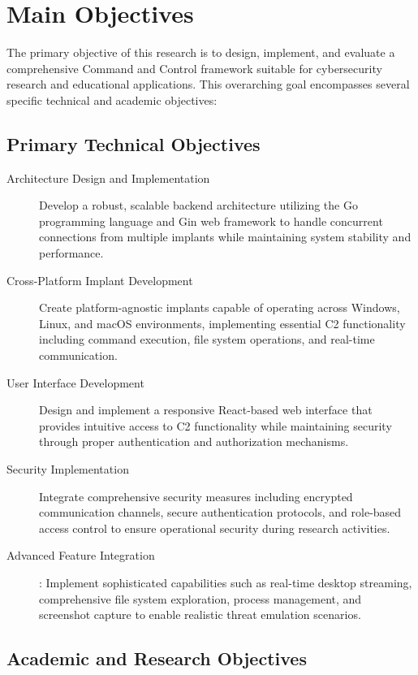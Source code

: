 \section{Main Objectives}
\label{sec:objectives}

The primary objective of this research is to design, implement, and evaluate a comprehensive Command and Control framework suitable for cybersecurity research and educational applications. This overarching goal encompasses several specific technical and academic objectives:

\subsection{Primary Technical Objectives}

\begin{description}
\item[Architecture Design and Implementation] Develop a robust, scalable backend architecture utilizing the Go programming language and Gin web framework to handle concurrent connections from multiple implants while maintaining system stability and performance.

\item[Cross-Platform Implant Development] Create platform-agnostic implants capable of operating across Windows, Linux, and macOS environments, implementing essential C2 functionality including command execution, file system operations, and real-time communication.

\item[User Interface Development] Design and implement a responsive React-based web interface that provides intuitive access to C2 functionality while maintaining security through proper authentication and authorization mechanisms.

\item[Security Implementation] Integrate comprehensive security measures including encrypted communication channels, secure authentication protocols, and role-based access control to ensure operational security during research activities.

\item[Advanced Feature Integration]: Implement sophisticated capabilities such as real-time desktop streaming, comprehensive file system exploration, process management, and screenshot capture to enable realistic threat emulation scenarios.
\end{description}

\subsection{Academic and Research Objectives}

